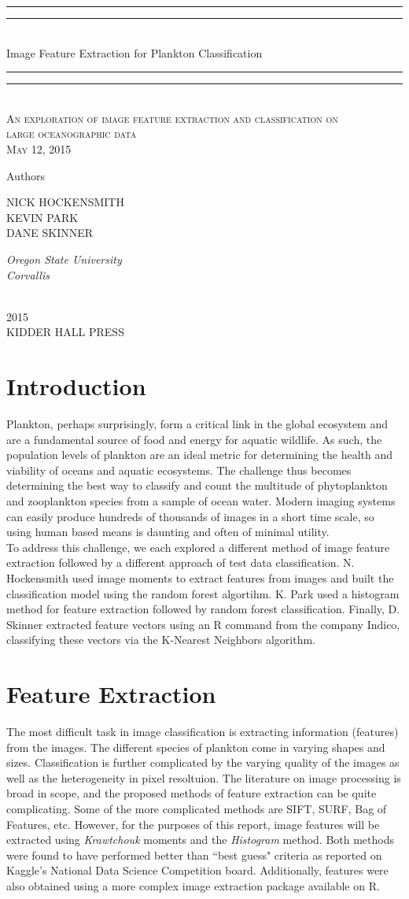 \documentclass[12pt]{article}
\newcommand*{\plogo}{\fbox{$\mathcal{KHP}$}} %
\newcommand*{\titleGP}{\begingroup %
\centering %
\vspace*{\baselineskip} %

\rule{\textwidth}{1.6pt}\vspace*{-\baselineskip}\vspace*{2pt} %
\rule{\textwidth}{0.4pt}\\[\baselineskip] %

{\LARGE Image Feature Extraction for Plankton Classification}\\[0.2\baselineskip] %

\rule{\textwidth}{0.4pt}\vspace*{-\baselineskip}\vspace{4pt} %
\rule{\textwidth}{1.6pt}\\[\baselineskip] %

\scshape %
An exploration of image feature extraction and classification on \\ large oceanographic data\\[\baselineskip] %
May 12, 2015\par %

\vspace*{2\baselineskip} %

Authors \\[\baselineskip]
{\Large NICK HOCKENSMITH \\ KEVIN PARK \\ DANE SKINNER\par} %
{\itshape Oregon State University \\ Corvallis\par} %

\vfill %

\plogo \\[0.3\baselineskip] %
{\scshape 2015} \\[0.3\baselineskip] %
{\large KIDDER HALL PRESS}\par %

\endgroup}
\begin{document}
 

\pagestyle{empty} %

\titleGP %

\newpage
\tableofcontents

\newpage
\pagestyle{plain}
\section{Introduction}
Plankton, perhaps surprisingly, form a critical link in the global ecosystem and are a fundamental source of food and energy for aquatic wildlife. As such, the population levels of plankton are an ideal metric for determining the health and viability of oceans and aquatic ecosystems. The challenge thus becomes determining the best way to classify and count the multitude of phytoplankton and zooplankton species from a sample of ocean water.  Modern imaging systems can easily produce hundreds of thousands of images in a short time scale, so using human based means is daunting and often of minimal utility. \\

\noindent To address this challenge, we each explored a different method of image feature extraction followed by a different approach of test data classification.  N. Hockensmith used image moments to extract features from images and built the classification model using the random forest algortihm. K. Park used a histogram method for feature extraction followed by random forest classification. Finally, D. Skinner extracted feature vectors using an R command from the company Indico, classifying these vectors via the K-Nearest Neighbors algorithm. 


\section{Feature Extraction}
The most difficult task in image classification is extracting information (features) from the images. The different species of plankton come in varying shapes and sizes. Classification is further complicated by the varying quality of the images as well as the heterogeneity in pixel resoltuion. The literature on image processing is broad in scope, and the proposed methods of feature extraction can be quite complicating. Some of the more complicated methods are SIFT, SURF, Bag of Features, etc. However, for the purposes of this report, image features will be extracted using \textit{Krawtchouk} moments and the \textit{Histogram} method. Both methods were found to have performed better than ``best guess" criteria as reported on Kaggle's National Data Science Competition board. Additionally, features were also obtained using a more complex image extraction package available on R.
\end{document}

